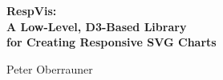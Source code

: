 %
%
% 
% 
% 




\vspace*{2cm}


\begin{center}
    \begin{spacing}{1.1}
        \Huge\sffamily\bfseries
        RespVis:\\
        A Low-Level, D3-Based Library\\
        for Creating Responsive SVG Charts
    \end{spacing}

    \vspace{3cm}


    \vspace{3cm}

    {\LARGE\sffamily
        Peter Oberrauner
    }
\end{center}








\cleardoublepage


\vspace*{-3cm}

